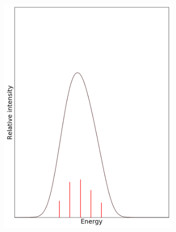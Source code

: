 \documentclass[12pt, fleqn]{beamer}
\begin{document}
\begin{frame}
\begin{overlayarea}{\textwidth}{14cm}
{\begin{figure}[h!]
\begin{subfigure}[b]{0.45\linewidth}
                    \includegraphics[width=\linewidth]{fc_sp/sp_4.png}
                \end{subfigure}
            \end{figure}
        }
\end{overlayarea}
\end{frame}
\end{document}
